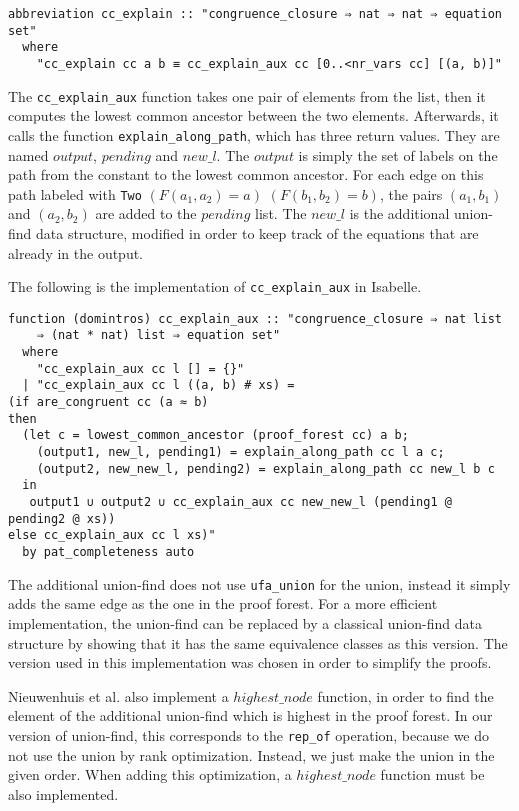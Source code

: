 \begin{lstlisting}
abbreviation cc_explain :: "congruence_closure ⇒ nat ⇒ nat ⇒ equation set"
  where
    "cc_explain cc a b ≡ cc_explain_aux cc [0..<nr_vars cc] [(a, b)]"
\end{lstlisting}

The \lstinline{cc_explain_aux} function takes one pair of elements from the list, then it
computes the lowest common ancestor between the two elements.
Afterwards, it calls the function \lstinline{explain_along_path}, which has three return values. They are named $output$, $pending$ and $new\_l$.
The $output$ is simply the set of labels on the path from the constant to the lowest common ancestor. For each edge on this path labeled with \lstinline|Two| $(F(a_1, a_2) = a)$ $(F(b_1, b_2) = b)$, the pairs $(a_1, b_1)$ and $(a_2, b_2)$ are added to the $pending$ list. The $new\_l$ is the additional union-find data structure, modified in order to keep track of the equations that are already in the output.

The following is the implementation of \lstinline|cc_explain_aux| in Isabelle.

\begin{lstlisting}
function (domintros) cc_explain_aux :: "congruence_closure ⇒ nat list
    ⇒ (nat * nat) list ⇒ equation set"
  where
    "cc_explain_aux cc l [] = {}"
  | "cc_explain_aux cc l ((a, b) # xs) =
(if are_congruent cc (a ≈ b)
then
  (let c = lowest_common_ancestor (proof_forest cc) a b;
    (output1, new_l, pending1) = explain_along_path cc l a c;
    (output2, new_new_l, pending2) = explain_along_path cc new_l b c
  in
   output1 ∪ output2 ∪ cc_explain_aux cc new_new_l (pending1 @ pending2 @ xs))
else cc_explain_aux cc l xs)"
  by pat_completeness auto
\end{lstlisting}

The additional union-find does not use \lstinline{ufa_union} for the union, instead it simply adds the same edge as the one in the proof forest.
For a more efficient implementation, the union-find can be replaced by a classical union-find data structure by showing that it has the same equivalence classes as this version.
The version used in this implementation was chosen in order to simplify the proofs.

Nieuwenhuis et al. \cite{Nieuwenhuis} also implement a $highest\_node$ function, in order to find the element of the additional union-find which is highest in the proof forest.
In our version of union-find, this corresponds to the \lstinline{rep_of} operation, because we do not use the union by rank optimization. Instead, we just make the union in the given order. When adding this optimization, a $highest\_node$ function must be also implemented.

